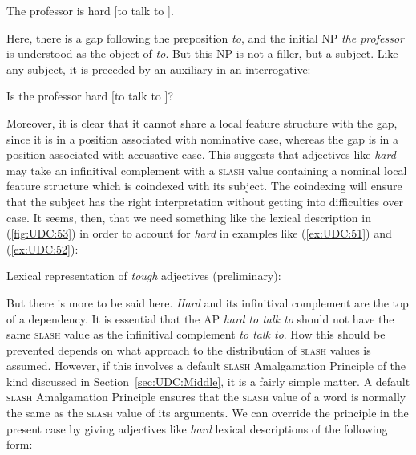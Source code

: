\documentclass[output=paper
,notxmath 
 	        ,biblatex
                ,babelshorthands
                ,newtxmath
                ,draftmode
                ,colorlinks, citecolor=brown
]{langscibook}
\begin{document}
\begin{exe}
\ex \label{ex:UDC:51}
The professor is hard [to talk to \trace{}].
\end{exe}

\noindent
Here, there is a gap following the preposition \emph{to}, and the
initial NP \emph{the professor} is understood as the object of
\emph{to}. But this NP is not a filler, but a subject. Like any subject,
it is preceded by an auxiliary in an interrogative:

\begin{exe}
\ex \label{ex:UDC:52}
 Is the professor hard [to talk to \trace{}]?
\end{exe}
 
\noindent
Moreover, it is clear that it cannot share a local feature structure
with the gap, since it is in a position associated with nominative case,
whereas the gap is in a position associated with accusative case. This
suggests that adjectives like \emph{hard} may take an infinitival
complement with a \textsc{slash} value containing a nominal local feature
structure which is coindexed with its subject. The coindexing will
ensure that the subject has the right interpretation without getting
into difficulties over case. It seems, then, that we need something like
the lexical description in (\ref{fig:UDC:53}) in order to account for \emph{hard} in examples like (\ref{ex:UDC:51})
and (\ref{ex:UDC:52}):
  
\ea
\label{fig:UDC:53}
Lexical representation of \textit{tough} adjectives (preliminary):\\
\z

\noindent
But there is more to be said here. \emph{Hard} and its infinitival
complement are the top of a dependency. It is essential that the AP
\emph{hard to talk to} should not have the same \textsc{slash} value
as the infinitival complement \emph{to talk to}. How this should be
prevented depends on what approach to the distribution of
\textsc{slash} values is assumed.  However, if this involves a default
\textsc{slash} Amalgamation Principle of the kind discussed in
Section~\ref{sec:UDC:Middle}, it is a fairly simple matter. A default
\textsc{slash} Amalgamation Principle ensures that the \textsc{slash}
value of a word is normally the same as the \textsc{slash} value of
its arguments. We can override the principle in the present case by
giving adjectives like \emph{hard} lexical descriptions of the
following form:
\end{document}
